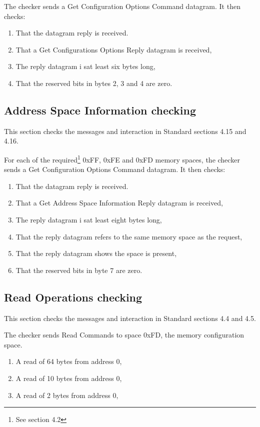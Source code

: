 \documentclass[11pt]{article}
\begin{document}
The checker sends a Get Configuration Options Command datagram.  It then checks:
\begin{enumerate}
\item That the datagram reply is received.
\item That a Get Configurations Options Reply datagram is received,
\item The reply datagram i sat least six bytes long,
\item That the reserved bits in bytes 2, 3 and 4 are zero.
\end{enumerate}

\subsection{Address Space Information checking}

This section checks the messages and interaction in Standard sections 4.15 and 4.16.

For each of the required\footnote{See section 4.2}
0xFF, 0xFE and 0xFD memory spaces, the
checker sends a Get Configuration Options Command datagram.  It then checks:
\begin{enumerate}
\item That the datagram reply is received.
\item That a Get Address Space Information Reply datagram is received,
\item The reply datagram i sat least eight bytes long,
\item That the reply datagram refers to the same memory space as the request,
\item That the reply datagram shows the space is present,
\item That the reserved bits in byte 7 are zero.
\end{enumerate}

\subsection{Read Operations checking}

This section checks the messages and interaction in Standard sections 4.4 and 4.5.

The checker sends Read Commands to space 0xFD, the memory configuration space.

\begin{enumerate}
\item A read of 64 bytes from address 0,
\item A read of 10 bytes from address 0,
\item A read of 2 bytes from address 0,
\end{enumerate}
\end{document}
